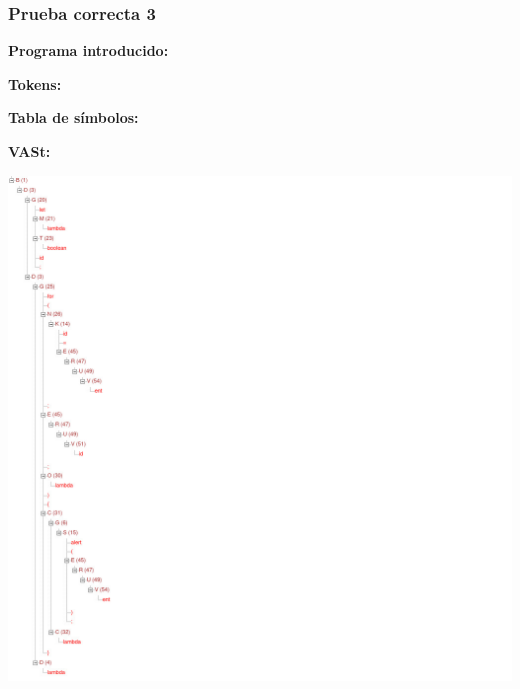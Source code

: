 \documentclass[11pt, , a4paper, titlepage]{article}
\newenvironment{changemargin}[2]{%
\begin{list}{}{%
\setlength{\topsep}{0pt}%
\setlength{\leftmargin}{#1}%
\setlength{\rightmargin}{#2}%
\setlength{\listparindent}{\parindent}%
\setlength{\itemindent}{\parindent}%
\setlength{\parsep}{\parskip}%
}%
\item[]}{\end{list}}
\begin{document}
\subsubsection{Prueba correcta 3}

\begin{changemargin}{+0.5cm}{+0cm}
    \vspace{1mm}

    \textbf{Programa introducido:}
    \begin{changemargin}{+0.5cm}{+0cm}
        
    \end{changemargin}

    \vspace{2mm}

    \textbf{Tokens:}
    \vspace{1mm}
    \begin{changemargin}{+0.5cm}{+0cm}
    \end{changemargin}

    \vspace{2mm}

    \textbf{Tabla de símbolos:}
    \vspace{1mm}
    \begin{changemargin}{+0.5cm}{+0cm}
    \end{changemargin}

    \clearpage

    \textbf{VASt:}
    \vspace{1mm}
    \begin{center}
        \includegraphics[width=1.4\textwidth]{./resources/test-cases/case-3/tree.jpg}
    \end{center}

\end{changemargin}
\clearpage
\end{document}

